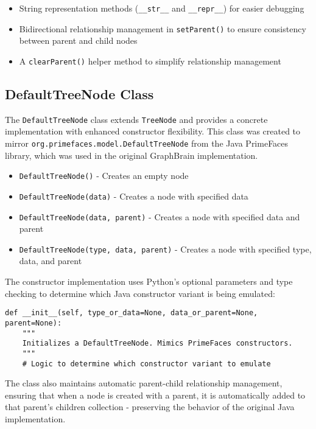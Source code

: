 \documentclass[12pt,a4paper]{article}
\begin{document}
\begin{itemize}
    \item String representation methods (\texttt{\_\_str\_\_} and \texttt{\_\_repr\_\_}) for easier debugging
    \item Bidirectional relationship management in \texttt{setParent()} to ensure consistency between parent and child nodes
    \item A \texttt{clearParent()} helper method to simplify relationship management
\end{itemize}



\subsection{DefaultTreeNode Class}
The \texttt{DefaultTreeNode} class extends \texttt{TreeNode} and provides a concrete implementation with enhanced constructor flexibility. This class was created to mirror \texttt{org.primefaces.model.DefaultTreeNode} from the Java PrimeFaces library, which was used in the original GraphBrain implementation.


\begin{itemize}
    \item \texttt{DefaultTreeNode()} - Creates an empty node
    \item \texttt{DefaultTreeNode(data)} - Creates a node with specified data
    \item \texttt{DefaultTreeNode(data, parent)} - Creates a node with specified data and parent
    \item \texttt{DefaultTreeNode(type, data, parent)} - Creates a node with specified type, data, and parent
\end{itemize}

The constructor implementation uses Python's optional parameters and type checking to determine which Java constructor variant is being emulated:

\begin{verbatim}
def __init__(self, type_or_data=None, data_or_parent=None, parent=None):
    """
    Initializes a DefaultTreeNode. Mimics PrimeFaces constructors.
    """
    # Logic to determine which constructor variant to emulate
\end{verbatim}

The class also maintains automatic parent-child relationship management, ensuring that when a node is created with a parent, it is automatically added to that parent's children collection - preserving the behavior of the original Java implementation.
\end{document}
